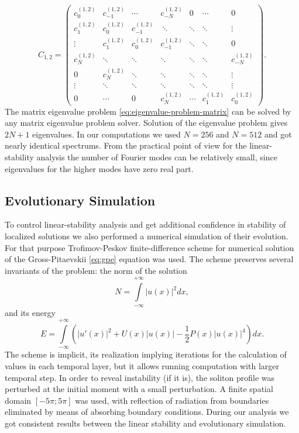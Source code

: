 \begin{equation}
	C_{1,2} =
	\begin{pmatrix}
		c_0^{(1,2)} & c_{-1}^{(1,2)} & \cdots & c_{-N}^{(1,2)} & 0 & \cdots & 0 \\
		c_1^{(1,2)} & c_0^{(1,2)} & c_{-1}^{(1,2)} & \ \ddots & \ddots & \ddots & \vdots \\
		\vdots & c_1^{(1,2)} & c_0^{(1,2)} & c_{-1}^{(1,2)} & \ddots & \ddots & 0 \\
		c_N^{(1,2)} & \ddots & \ddots & \ddots & \ddots & \ddots & c_{-N}^{(1,2)} \\
		0 & c_N^{(1,2)} & \ddots & \ddots & \ddots & \ddots & \vdots \\
		\vdots & \ddots & \ddots & \ddots & \ddots & \ddots & \vdots \\
		0 & \cdots & 0 & c_N^{(1,2)} & \cdots & c_1^{(1,2)} & c_0^{(1,2)}
	\end{pmatrix}.
\end{equation}
The matrix eigenvalue problem \eqref{eq:eigenvalue-problem-matrix} can be solved by any matrix eigenvalue problem solver.
Solution of the eigenvalue problem gives $2N + 1$ eigenvalues.
In our computations we used $N = 256$ and $N = 512$ and got nearly identical spectrums.
From the practical point of view for the linear-stability analysis the number of Fourier modes can be relatively small, since eigenvalues for the higher modes have zero real part.

\subsection{Evolutionary Simulation}

To control linear-stability analysis and get additional confidence in stability of localized solutions we also performed a numerical simulation of their evolution.
For that purpose Trofimov-Peskov finite-difference scheme \cite{TrofimovPeskov} for numerical solution of the Gross-Pitaevskii \eqref{eq:gpe} equation was used. 
The scheme preserves several invariants of the problem: the norm of the solution
\begin{equation}
	N = \int \limits_{-\infty}^{+\infty} |u(x)|^2 dx,
\label{eq:norm}
\end{equation}
and its energy
\begin{equation}
	E = \int \limits_{-\infty}^{+\infty} \left( |u'(x)|^2 + U(x) |u(x)| - \dfrac{1}{2} P(x) |u(x)|^4 \right) dx.
\label{eq:energy}
\end{equation}
The scheme is implicit, its realization implying iterations for the calculation of values in each temporal layer, but it allows running computation with larger temporal step.
In order to reveal instability (if it is), the soliton profile was perturbed at the initial moment with a small perturbation.
A finite spatial domain $[-5 \pi; 5 \pi]$ was used, with reflection of radiation from boundaries eliminated by means of absorbing boundary conditions.
During our analysis we got consistent results between the linear stability and evolutionary simulation.

